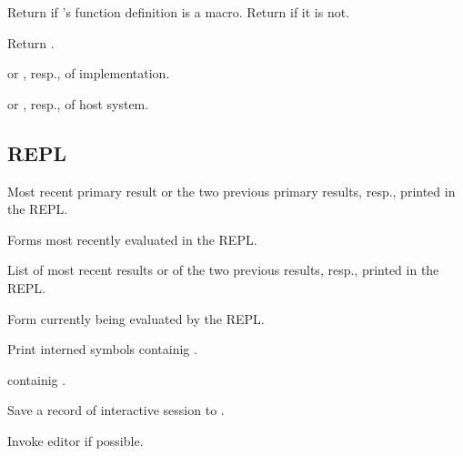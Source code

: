 \begin{LIST}{1cm}
  Return  if 's function definition
  is a macro. Return \retval{\NIL} if it is not.

  Return .

   or , resp., of implementation.

   or , resp., of host system.

\end{LIST}


\subsection{REPL} 

\begin{LIST}{1cm}
  
  \IT{\Goo{\kwd*{*}\XOR\kwd*{**}\XOR\V*{***}}}
  Most recent primary result or the two previous primary results,
  resp., printed in the REPL. 
  
  \IT{\Goo{\kwd*{+}\XOR\kwd*{++}\XOR\V*{+++}}}
  Forms most recently evaluated in the REPL.
  
  \IT{\Goo{\kwd*{/}\XOR\kwd*{//}\XOR\V*{///}}}
  List of most recent results or of the two previous results, resp., printed in the REPL.
  
  \IT{\kwd*{--}}
  Form currently being evaluated by the REPL.

  Print interned symbols containig .

   containig .

  Save a record of interactive session to .

  Invoke editor if possible.

\end{LIST}


